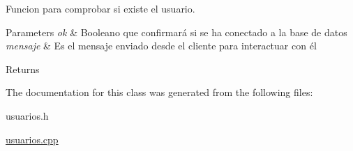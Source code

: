 Funcion para comprobar si existe el usuario. 


\begin{DoxyParams}{Parameters}
{\em ok} & Booleano que confirmará si se ha conectado a la base de datos \\
\hline
{\em mensaje} & Es el mensaje enviado desde el cliente para interactuar con él \\
\hline
\end{DoxyParams}
\begin{DoxyReturn}{Returns}

\end{DoxyReturn}


The documentation for this class was generated from the following files\+:\begin{DoxyCompactItemize}
\item 
usuarios.\+h\item 
\mbox{\hyperlink{usuarios_8cpp}{usuarios.\+cpp}}\end{DoxyCompactItemize}
